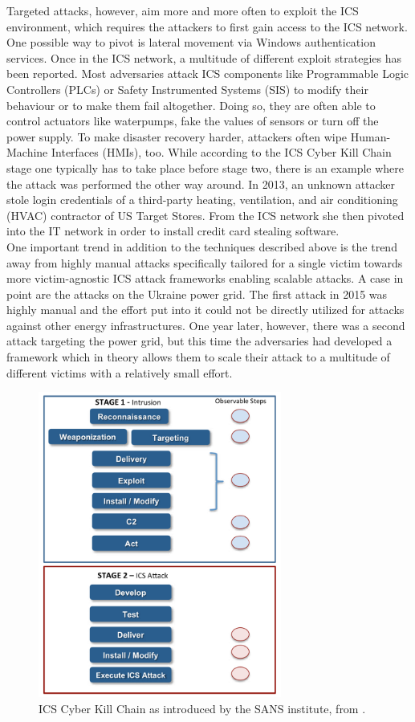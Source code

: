 \documentclass[runningheads]{llncs}
\begin{document}
Targeted attacks, however, aim more and more often to exploit the ICS environment, which requires the attackers to first gain access to the ICS network.
One possible way to pivot is lateral movement via Windows authentication services.
Once in the ICS network, a multitude of different exploit strategies has been reported.
Most adversaries attack ICS components like Programmable Logic Controllers (PLCs) or Safety Instrumented Systems (SIS) to modify their behaviour or to make them fail altogether.
Doing so, they are often able to control actuators like waterpumps, fake the values of sensors or turn off the power supply.
To make disaster recovery harder, attackers often wipe Human-Machine Interfaces (HMIs), too.
While according to the ICS Cyber Kill Chain stage one typically has to take place before stage two, there is an example where the attack was performed the other way around.
In 2013, an unknown attacker stole login credentials of a third-party heating, ventilation, and air conditioning (HVAC) contractor of US Target Stores.
From the ICS network she then pivoted into the IT network in order to install credit card stealing software. \cite{hemsley.18}\\
One important trend in addition to the techniques described above is the trend away from highly manual attacks specifically tailored for a single victim towards more victim-agnostic ICS attack frameworks enabling scalable attacks.
A case in point are the attacks on the Ukraine power grid.
The first attack in 2015 was highly manual and the effort put into it could not be directly utilized for attacks against other energy infrastructures.
One year later, however, there was a second attack targeting the power grid, but this time the adversaries had developed a framework which in theory allows them to scale their attack to a multitude of different victims with a relatively small effort. \cite{greenberg.17}
\begin{figure}[H]
    \centering
    \includegraphics[width=8cm]{figures/ICSCyberKillChain.png}
    \caption{ICS Cyber Kill Chain as introduced by the SANS institute, from \cite{assante.15}.}
    \label{fig:CyberKillChain}
\end{figure}
\end{document}
